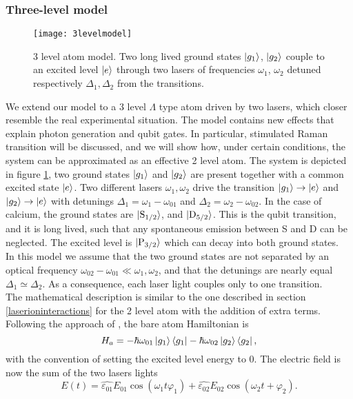 \subsubsection{Three-level model}
\label{sec:threelevel}
\begin{figure}
\centering
\texttt{[image: 3levelmodel]}
\caption{3 level atom model. Two long lived ground states $\ket{g_1}$, $\ket{g_2}$ couple to an excited level $\ket{e}$ through two lasers of frequencies $\omega_1$, $\omega_2$ detuned respectively $\Delta_1,\Delta_2$ from the transitions.}
\label{3levelmodel}
\end{figure}
We extend our model to a 3 level $\Lambda$ type atom driven by two lasers, which closer resemble the real experimental situation. The model contains new effects that explain photon generation and qubit gates. In particular, stimulated Raman transition will be discussed, and we will show how, under certain conditions, the system can be approximated as an effective 2 level atom. The system is depicted in figure \ref{3levelmodel}, two ground states $\ket{g_1}$ and $\ket{g_2}$ are present together with a common excited state $\ket{e}$. Two different lasers $\omega_1,\omega_2$ drive the transition $\ket{g_1} \to \ket{e}$ and $\ket{g_2} \to \ket{e}$ with detunings $\Delta_1 = \omega_1 - \omega_{01}$ and $\Delta_2 = \omega_2 - \omega_{02}$. In the case of calcium, the ground states are $\ket{\text{S}_{1/2}}$, and $\ket{\text{D}_{5/2}}$. This is the qubit transition, and it is long lived, such that any spontaneous emission between S and D can be neglected. The excited level is $\ket{\text{P}_{3/2}}$ which can decay into both ground states.\\
In this model we assume that the two ground states are not separated by an optical frequency $\omega_{02} - \omega_{01} \ll \omega_1,\omega_2$, and that the detunings are nearly equal $\Delta_1 \simeq \Delta_2$. As a consequence, each laser light couples only to one transition.\\
The mathematical description is similar to the one described in section \ref{laserioninteractions} for the 2 level atom with the addition of extra terms. Following the approach of \cite{steck}, the bare atom Hamiltonian is
\begin{equation}
H_a = -\hbar \omega_{01}\ket{g_1}\bra{g_1} - \hbar \omega_{02}\ket{g_2}\bra{g_2},
\end{equation}
with the convention of setting the excited level energy to 0. The electric field is now the sum of the two lasers lights
\begin{equation}
E(t) = \hat{\varepsilon_{01}} E_{01} \cos(\omega_{1} t \varphi_1) + \hat{\varepsilon_{02}} E_{02} \cos(\omega_2 t + \varphi_2).
\end{equation}
